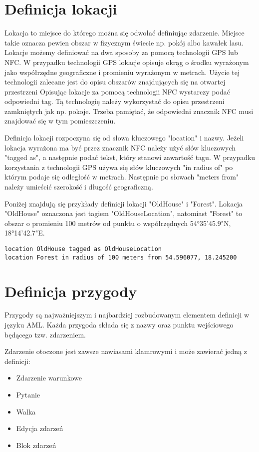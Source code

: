 \documentclass	{xmgr}
\begin{document}
\section{Definicja lokacji}
Lokacja to miejsce do którego można się odwołać definiując zdarzenie. Miejsce takie oznacza pewien obszar w fizycznym świecie np. pokój albo kawałek lasu. Lokacje możemy definiować na dwa sposoby za pomocą technologii GPS lub NFC. 
W przypadku technologii GPS lokacje opisuje okrąg o środku wyrażonym jako współrzędne geograficzne i promieniu wyrażonym w metrach. Użycie tej technologii zalecane jest do opisu obszarów znajdujących się na otwartej przestrzeni 
Opisując lokacje za pomocą technologii NFC wystarczy podać odpowiedni tag. Tą technologię należy wykorzystać do opisu przestrzeni zamkniętych jak np. pokoje. Trzeba pamiętać, że odpowiedni znacznik NFC musi znajdować się w tym pomieszczeniu.

Definicja lokacji rozpoczyna się od słowa kluczowego "location" i nazwy. Jeżeli lokacja wyrażona ma być przez znacznik NFC należy użyć słów kluczowych "tagged as", a następnie podać tekst, który stanowi zawartość tagu. W przypadku korzystania z technologii GPS używa się słów kluczowych "in radius of" po którym podaje się odległość w metrach. Następnie po słowach "meters from" należy umieścić szerokość i długość geograficzną.

Poniżej znajdują się przykłady definicji lokacji "OldHouse" i "Forest". Lokacja "OldHouse" oznaczona jest tagiem "OldHouseLocation", natomiast 
"Forest" to obszar o promieniu 100 metrów od punktu o współrzędnych 54°35'45.9"N, 18°14'42.7"E.
\begin{lstlisting}
location OldHouse tagged as OldHouseLocation
location Forest in radius of 100 meters from 54.596077, 18.245200
\end{lstlisting}


\section{Definicja przygody}
Przygody są najważniejszym i najbardziej rozbudowanym elementem definicji w języku AML. Każda przygoda składa się z nazwy oraz punktu wejściowego będącego tzw. zdarzeniem.

Zdarzenie otoczone jest zawsze nawiasami klamrowymi i może zawierać jedną z definicji:
\begin{itemize}
	\item Zdarzenie warunkowe
	\item Pytanie
	\item Walka
	\item Edycja zdarzeń
	\item Blok zdarzeń
\end{itemize}
\end{document}
